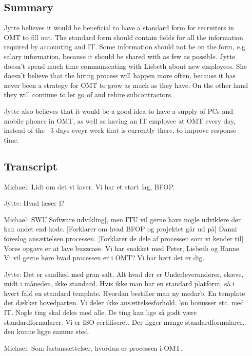\begin{linenumbers*}
\subsection{Summary}
Jytte believes it would be beneficial to have a standard form for recruiters in OMT to fill out.
The standard form should contain fields for all the information required by accounting and IT.
Some information should not be on the form, e.g. salary information, because it should be shared with as few as possible.
Jytte doesn't spend much time communicating with Lisbeth about new employees.
She doesn't believe that the hiring process will happen more often, because it has never been a strategy for OMT to grow as much as they have.
On the other hand they will continue to let go of and rehire subcontractors.

Jytte also believes that it would be a good idea to have a supply of PCs and mobile phones in OMT, as well as having an IT employee at OMT every day, instead of the ~3 days eveyr week that is currently there, to improve response time.

\subsection{Transcript}
\label{app:jytte}
Michael:
Lidt om det vi laver. Vi har et stort fag, BFOP.

Jytte:
Hvad læser I?

Michael:
SWU[Software udvikling], men ITU vil gerne have nogle udviklere
der kan andet end kode.
[Forklarer om hvad BFOP og projektet går ud på]
Danni foreslog ansættelsen processen. 
[Forklarer de dele af processen som vi kender til]
Vores opgave er at lave buzzcase. Vi har snakket med Peter,
Lisbeth og Hanne. Vi vil gerne høre hvad processen er i OMT?
Vi har hørt det er dig.

Jytte:
Det er sandhed med gran salt. Alt hvad der er
Underleverandører, skæve, midt i måneden, ikke standard.
Hvis ikke man har en standard platform, så i hvert fald
en standard template. 
Hvordan bestiller man ny medarb. En template der dækker hovedparten.
Vi deler ikke ansættelsesforhold, løn bonusser etc. med IT.
Nogle ting skal deles med alle. De ting kan lige så godt være
standardformularer.
Vi er ISO certifiseret. Der ligger mange standardformularer,
den kunne ligge samme sted.

Michael:
Som fastansættelser, hvordan er processen i OMT.


\end{linenumbers*}
